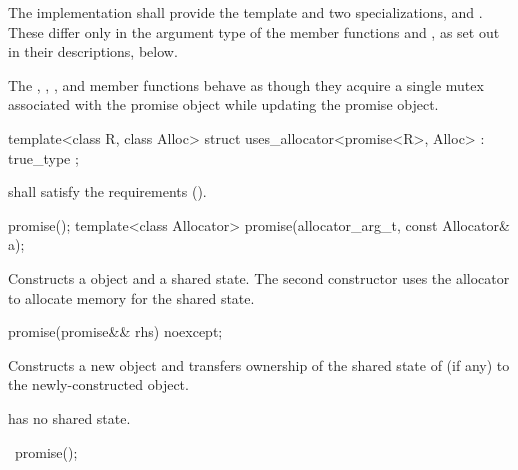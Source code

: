 \pnum
The implementation shall provide the template  and two specializations,
 and . These differ only in the argument type
of the member functions  and ,
as set out in their descriptions, below.

\pnum
The , , ,
and  member functions behave as though
they acquire a single mutex associated with the promise object while updating the
promise object.

%
\begin{itemdecl}
template<class R, class Alloc>
  struct uses_allocator<promise<R>, Alloc>
    : true_type { };
\end{itemdecl}

\begin{itemdescr}
\pnum
\requires {} shall satisfy the 
requirements ().
\end{itemdescr}


%
\begin{itemdecl}
promise();
template<class Allocator>
  promise(allocator_arg_t, const Allocator& a);
\end{itemdecl}

\begin{itemdescr}
\pnum
\effects Constructs a  object and a shared state. The second
constructor uses the allocator  to allocate memory for the shared
state.
\end{itemdescr}

%
\begin{itemdecl}
promise(promise&& rhs) noexcept;
\end{itemdecl}

\begin{itemdescr}
\pnum
\effects Constructs a new  object and transfers ownership of the shared state
of  (if any) to the newly-constructed object.

\pnum
\postconditions {} has no shared state.
\end{itemdescr}

%
\begin{itemdecl}
~promise();
\end{itemdecl}

